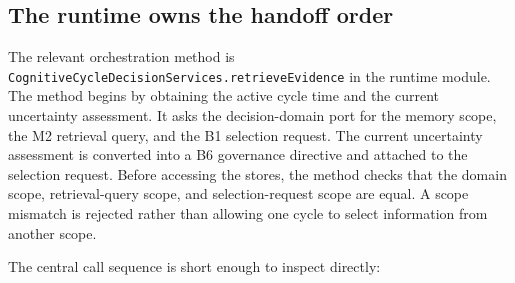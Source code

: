 \subsection{The runtime owns the handoff order}
\label{subsec:ch21-b1-call-order}

The relevant orchestration method is \texttt{Cognitive\allowbreak{}Cycle\allowbreak{}Decision\allowbreak{}Services.\allowbreak{}retrieve\allowbreak{}Evidence} in the runtime module. The method begins by obtaining the active cycle time and the current uncertainty assessment. It asks the decision-domain port for the memory scope, the M2 retrieval query, and the B1 selection request. The current uncertainty assessment is converted into a B6 governance directive and attached to the selection request. Before accessing the stores, the method checks that the domain scope, retrieval-query scope, and selection-request scope are equal. A scope mismatch is rejected rather than allowing one cycle to select information from another scope.

The central call sequence is short enough to inspect directly:

